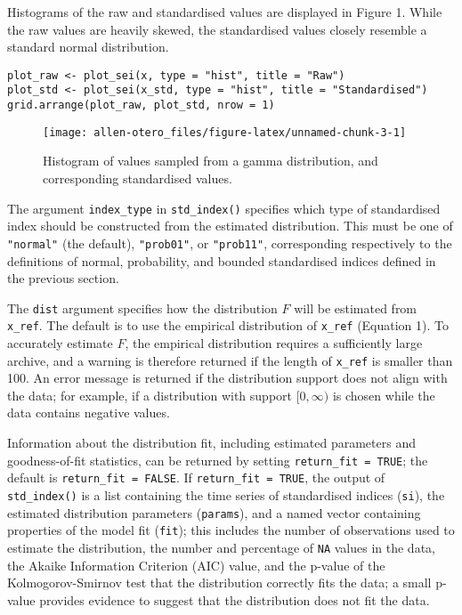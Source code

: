 Histograms of the raw and standardised values are displayed in Figure 1. While the raw values are heavily skewed, the standardised values closely resemble a standard normal distribution.

\begin{verbatim}
plot_raw <- plot_sei(x, type = "hist", title = "Raw")
plot_std <- plot_sei(x_std, type = "hist", title = "Standardised")
grid.arrange(plot_raw, plot_std, nrow = 1)
\end{verbatim}

\begin{figure}

{\centering \texttt{[image: allen-otero\_files/figure-latex/unnamed-chunk-3-1]} 

}

\caption{Histogram of values sampled from a gamma distribution, and corresponding standardised values.}\label{fig:unnamed-chunk-3}
\end{figure}

The argument \texttt{index\_type} in \texttt{std\_index()} specifies which type of standardised index should be constructed from the estimated distribution. This must be one of \texttt{"normal"} (the default), \texttt{"prob01"}, or \texttt{"prob11"}, corresponding respectively to the definitions of normal, probability, and bounded standardised indices defined in the previous section.

The \texttt{dist} argument specifies how the distribution \(F\) will be estimated from \texttt{x\_ref}. The default is to use the empirical distribution of \texttt{x\_ref} (Equation 1). To accurately estimate \(F\), the empirical distribution requires a sufficiently large archive, and a warning is therefore returned if the length of \texttt{x\_ref} is smaller than 100. An error message is returned if the distribution support does not align with the data; for example, if a distribution with support \([0, \infty)\) is chosen while the data contains negative values.

Information about the distribution fit, including estimated parameters and goodness-of-fit statistics, can be returned by setting \texttt{return\_fit\ =\ TRUE}; the default is \texttt{return\_fit\ =\ FALSE}. If \texttt{return\_fit\ =\ TRUE}, the output of \texttt{std\_index()} is a list containing the time series of standardised indices (\texttt{si}), the estimated distribution parameters (\texttt{params}), and a named vector containing properties of the model fit (\texttt{fit}); this includes the number of observations used to estimate the distribution, the number and percentage of \texttt{NA} values in the data, the Akaike Information Criterion (AIC) value, and the p-value of the Kolmogorov-Smirnov test that the distribution correctly fits the data; a small p-value provides evidence to suggest that the distribution does not fit the data.

